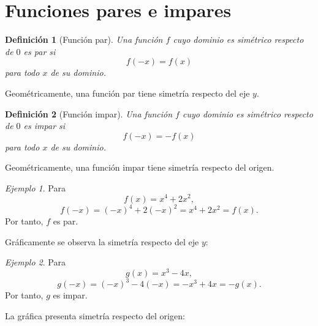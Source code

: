 \documentclass[12pt]{article}
\newtheorem{definicion}{Definición}[section]
\theoremstyle{remark}
\newtheorem{ejemplo}{Ejemplo}[section]
\begin{document}
\section{Funciones pares e impares}

\begin{definicion}[Función par]
Una función $f$ cuyo dominio es simétrico respecto de $0$ es \emph{par} si
\[
f(-x)=f(x)
\]
para todo $x$ de su dominio.
\end{definicion}

Geométricamente, una función par tiene simetría respecto del eje $y$.

\begin{definicion}[Función impar]
Una función $f$ cuyo dominio es simétrico respecto de $0$ es \emph{impar} si
\[
f(-x)=-f(x)
\]
para todo $x$ de su dominio.
\end{definicion}

Geométricamente, una función impar tiene simetría respecto del origen.

\begin{ejemplo}
Para
\[
f(x)=x^4+2x^2,
\]
\[
f(-x)=(-x)^4+2(-x)^2=x^4+2x^2=f(x).
\]
Por tanto, $f$ es par.

Gráficamente se observa la simetría respecto del eje $y$:
\begin{center}
\end{center}
\end{ejemplo}

\begin{ejemplo}
Para
\[
g(x)=x^3-4x,
\]
\[
g(-x)=(-x)^3-4(-x)=-x^3+4x=-g(x).
\]
Por tanto, $g$ es impar.

La gráfica presenta simetría respecto del origen:
\begin{center}
\end{center}
\end{ejemplo}
\end{document}
